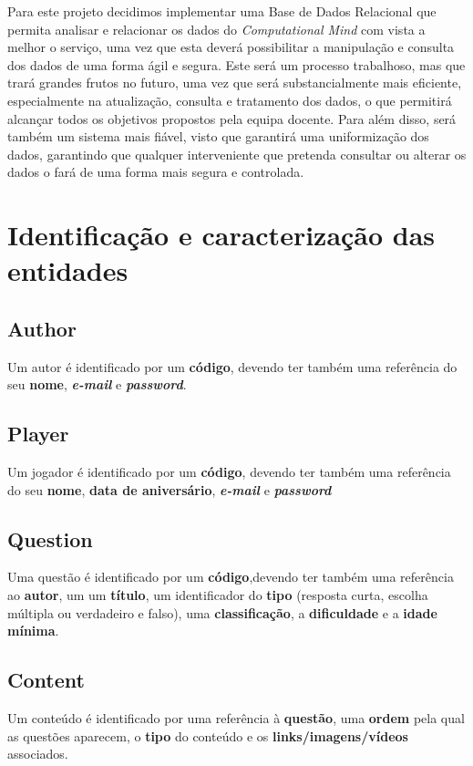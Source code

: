 \documentclass[11pt,a4paper]{report}
\begin{document}
Para este projeto decidimos implementar uma Base de Dados Relacional que permita analisar e relacionar os dados do \emph{Computational Mind} com vista a melhor o serviço, uma vez que esta deverá possibilitar a manipulação e consulta dos dados de uma forma ágil e segura. 
Este será um processo trabalhoso, mas que trará grandes frutos no futuro, uma vez que será substancialmente mais eficiente, especialmente na atualização, consulta e tratamento dos dados, o que permitirá alcançar todos os objetivos propostos pela equipa docente. Para além disso, será também um sistema mais fiável, visto que garantirá uma uniformização dos dados, garantindo que qualquer interveniente que pretenda consultar ou alterar os dados o fará de uma forma mais segura e controlada.

\section{Identificação e caracterização das entidades}

\subsection{Author}
Um autor é identificado por um \textbf{código}, devendo ter também uma referência do seu \textbf{nome}, \textbf{\emph{e-mail}} e \textbf{\emph{password}}.

\subsection{Player}
Um jogador é identificado por um \textbf{código}, devendo ter também uma referência do seu \textbf{nome}, \textbf{data de aniversário}, \textbf{\emph{e-mail}} e \textbf{\emph{password}}

\subsection{Question}
Uma questão é identificado por um \textbf{código},devendo ter também uma referência ao \textbf{autor}, um um \textbf{título}, um identificador do \textbf{tipo} (resposta curta, escolha múltipla ou verdadeiro e falso), uma \textbf{classificação}, a \textbf{dificuldade} e a \textbf{idade mínima}.

\subsection{Content}
Um conteúdo é identificado por uma referência à \textbf{questão}, uma \textbf{ordem} pela qual as questões aparecem, o \textbf{tipo} do conteúdo e os \textbf{links/imagens/vídeos} associados. 
\end{document}
